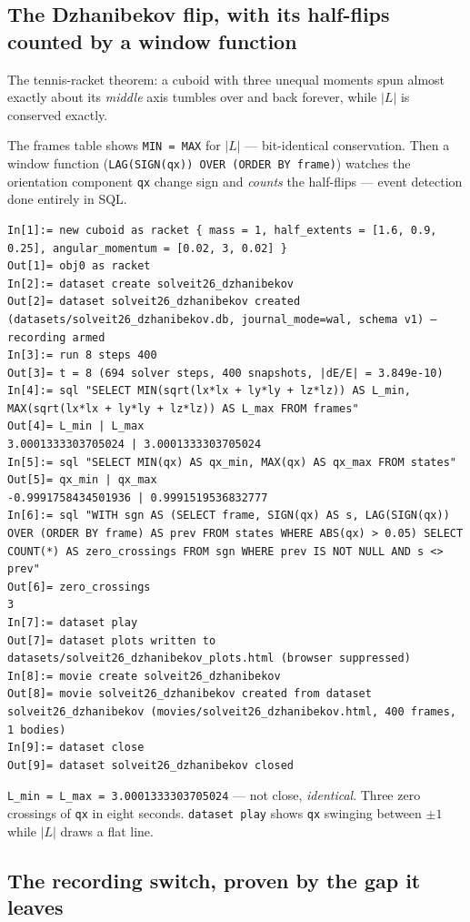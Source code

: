 \documentclass[11pt]{article}
\newcommand{\code}[1]{\texttt{#1}}
\begin{document}
\subsection{The Dzhanibekov flip, with its half-flips counted by a window function}

The tennis-racket theorem: a cuboid with three unequal moments spun
almost exactly about its \emph{middle} axis tumbles over and back
forever, while $|L|$ is conserved exactly.

The frames table shows \code{MIN = MAX} for $|L|$ --- bit-identical
conservation. Then a window function (\code{LAG(SIGN(qx)) OVER (ORDER
BY frame)}) watches the orientation component \code{qx} change sign
and \emph{counts} the half-flips --- event detection done entirely in
SQL.

\begin{lstlisting}
In[1]:= new cuboid as racket { mass = 1, half_extents = [1.6, 0.9, 0.25], angular_momentum = [0.02, 3, 0.02] }
Out[1]= obj0 as racket
In[2]:= dataset create solveit26_dzhanibekov
Out[2]= dataset solveit26_dzhanibekov created (datasets/solveit26_dzhanibekov.db, journal_mode=wal, schema v1) — recording armed
In[3]:= run 8 steps 400
Out[3]= t = 8 (694 solver steps, 400 snapshots, |dE/E| = 3.849e-10)
In[4]:= sql "SELECT MIN(sqrt(lx*lx + ly*ly + lz*lz)) AS L_min, MAX(sqrt(lx*lx + ly*ly + lz*lz)) AS L_max FROM frames"
Out[4]= L_min | L_max
3.0001333303705024 | 3.0001333303705024
In[5]:= sql "SELECT MIN(qx) AS qx_min, MAX(qx) AS qx_max FROM states"
Out[5]= qx_min | qx_max
-0.9991758434501936 | 0.9991519536832777
In[6]:= sql "WITH sgn AS (SELECT frame, SIGN(qx) AS s, LAG(SIGN(qx)) OVER (ORDER BY frame) AS prev FROM states WHERE ABS(qx) > 0.05) SELECT COUNT(*) AS zero_crossings FROM sgn WHERE prev IS NOT NULL AND s <> prev"
Out[6]= zero_crossings
3
In[7]:= dataset play
Out[7]= dataset plots written to datasets/solveit26_dzhanibekov_plots.html (browser suppressed)
In[8]:= movie create solveit26_dzhanibekov
Out[8]= movie solveit26_dzhanibekov created from dataset solveit26_dzhanibekov (movies/solveit26_dzhanibekov.html, 400 frames, 1 bodies)
In[9]:= dataset close
Out[9]= dataset solveit26_dzhanibekov closed
\end{lstlisting}

\code{L\_min = L\_max = 3.0001333303705024} --- not close,
\emph{identical}. Three zero crossings of \code{qx} in eight seconds.
\code{dataset play} shows \code{qx} swinging between $\pm 1$ while
$|L|$ draws a flat line.

\subsection{The recording switch, proven by the gap it leaves}
\end{document}
